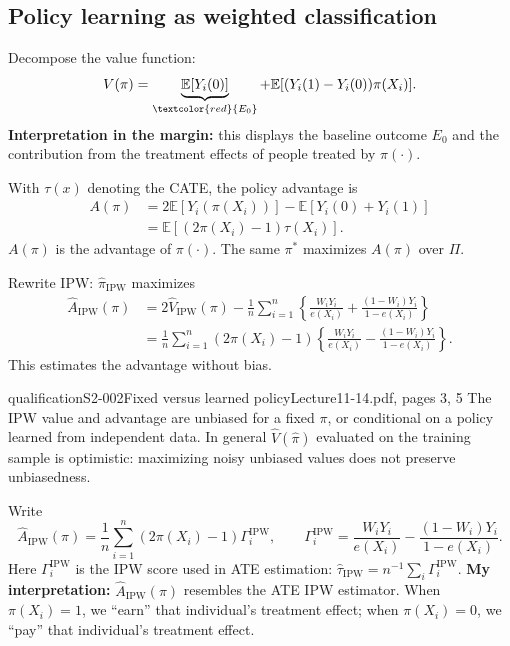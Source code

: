 \subsection{Policy learning as weighted classification}
Decompose the value function:
\[
 V(\pi)=\underbrace{\mathbb E[Y_i(0)]}_{\textcolor{red}{E_0}}+
 \mathbb E[(Y_i(1)-Y_i(0))\pi(X_i)].
\]
\textbf{Interpretation in the margin:} this displays the baseline outcome $E_0$ and the contribution from the treatment effects of people treated by $\pi(\cdot)$.

With $\tau(x)$ denoting the CATE, the policy advantage is
\begin{align*}
 A(\pi)&=2\mathbb E[Y_i(\pi(X_i))]-\mathbb E[Y_i(0)+Y_i(1)]\\
 &=\mathbb E[(2\pi(X_i)-1)\tau(X_i)].
\end{align*}
$A(\pi)$ is the advantage of $\pi(\cdot)$. The same $\pi^*$ maximizes $A(\pi)$ over $\Pi$.

Rewrite IPW: $\widehat\pi_{\mathrm{IPW}}$ maximizes
\begin{align*}
 \widehat A_{\mathrm{IPW}}(\pi)
 &=2\widehat V_{\mathrm{IPW}}(\pi)
 -\frac1n\sum_{i=1}^n\left\{
 \frac{W_iY_i}{e(X_i)}+\frac{(1-W_i)Y_i}{1-e(X_i)}\right\}\\
 &=\frac1n\sum_{i=1}^n(2\pi(X_i)-1)
 \left\{\frac{W_iY_i}{e(X_i)}-
 \frac{(1-W_i)Y_i}{1-e(X_i)}\right\}.\tag{11.10}
\end{align*}
This estimates the advantage without bias.

\begin{reviewnote}{qualification}{S2-002}{Fixed versus learned policy}{Lecture11-14.pdf, pages 3, 5}
The IPW value and advantage are unbiased for a fixed $\pi$, or conditional on a policy learned from independent data. In general $\widehat V(\widehat\pi)$ evaluated on the training sample is optimistic: maximizing noisy unbiased values does not preserve unbiasedness.
\end{reviewnote}
 Write
\[
 \widehat A_{\mathrm{IPW}}(\pi)
 =\frac1n\sum_{i=1}^n(2\pi(X_i)-1)\Gamma_i^{\mathrm{IPW}},
 \qquad
 \Gamma_i^{\mathrm{IPW}}=
 \frac{W_iY_i}{e(X_i)}-\frac{(1-W_i)Y_i}{1-e(X_i)}.\tag{11.11}
\]
Here $\Gamma_i^{\mathrm{IPW}}$ is the IPW score used in ATE estimation:
$\widehat\tau_{\mathrm{IPW}}=n^{-1}\sum_i\Gamma_i^{\mathrm{IPW}}$.
\textbf{My interpretation:} $\widehat A_{\mathrm{IPW}}(\pi)$ resembles the ATE IPW estimator. When $\pi(X_i)=1$, we ``earn'' that individual's treatment effect; when $\pi(X_i)=0$, we ``pay'' that individual's treatment effect.

